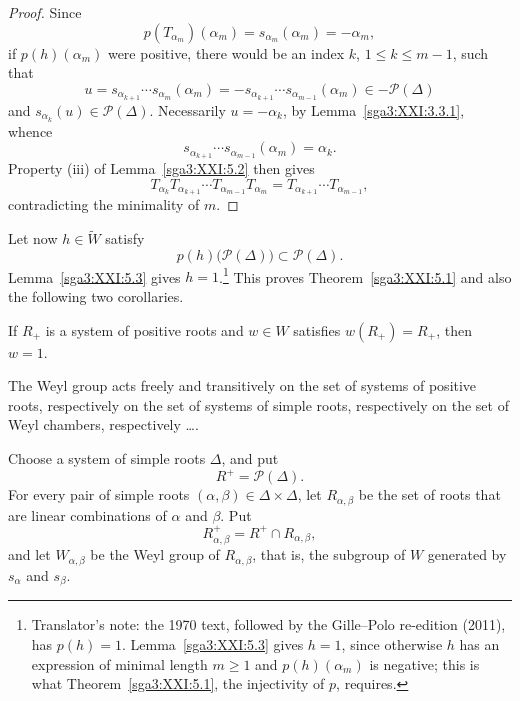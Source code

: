 \begin{proof}
Since
\[
 p(T_{\alpha_m})(\alpha_m)
 =s_{\alpha_m}(\alpha_m)=-\alpha_m,
\]
if \(p(h)(\alpha_m)\) were positive, there would be an index
\(k\), \(1\le k\le m-1\), such that
\[
 u=s_{\alpha_{k+1}}\cdots s_{\alpha_m}(\alpha_m)
 =-s_{\alpha_{k+1}}\cdots s_{\alpha_{m-1}}(\alpha_m)
 \in-\mathscr{P}(\Delta)
\]
and \(s_{\alpha_k}(u)\in\mathscr{P}(\Delta)\). Necessarily
\(u=-\alpha_k\), by Lemma~\ref{sga3:XXI:3.3.1}, whence
\[
 s_{\alpha_{k+1}}\cdots s_{\alpha_{m-1}}(\alpha_m)=\alpha_k.
\]
Property (iii) of Lemma~\ref{sga3:XXI:5.2} then gives
\[
 T_{\alpha_k}T_{\alpha_{k+1}}\cdots
 T_{\alpha_{m-1}}T_{\alpha_m}
 =
 T_{\alpha_{k+1}}\cdots T_{\alpha_{m-1}},
\]
contradicting the minimality of \(m\).
\end{proof}

Let now \(h\in\widetilde W\) satisfy
\[
 p(h)\bigl(\mathscr{P}(\Delta)\bigr)
 \subset\mathscr{P}(\Delta).
\]
Lemma~\ref{sga3:XXI:5.3} gives \(h=1\).\footnote{Translator's note: the 1970 text,
followed by the Gille--Polo re-edition (2011), has \(p(h)=1\). Lemma~\ref{sga3:XXI:5.3}
gives \(h=1\), since otherwise \(h\) has an expression of minimal length \(m\geq1\) and
\(p(h)(\alpha_m)\) is negative; this is what Theorem~\ref{sga3:XXI:5.1}, the injectivity
of \(p\), requires.} This proves
Theorem~\ref{sga3:XXI:5.1} and also the following two corollaries.

\begin{corollary}\label{sga3:XXI:5.4}
If \(R_+\) is a system of positive roots and \(w\in W\) satisfies
\(w(R_+)=R_+\), then \(w=1\).
\end{corollary}

\begin{corollary}\label{sga3:XXI:5.5}
The Weyl group acts freely and transitively on the set of systems of
positive roots, respectively on the set of systems of simple roots,
respectively on the set of Weyl chambers, respectively \ldots.
\end{corollary}

Choose a system of simple roots \(\Delta\), and put
\[
 R^+=\mathscr{P}(\Delta).
\]
For every pair of simple roots
\((\alpha,\beta)\in\Delta\times\Delta\), let
\(R_{\alpha,\beta}\) be the set of roots that are linear combinations
of \(\alpha\) and \(\beta\). Put
\[
 R^+_{\alpha,\beta}=R^+\cap R_{\alpha,\beta},
\]
and let \(W_{\alpha,\beta}\) be the Weyl group of
\(R_{\alpha,\beta}\), that is, the subgroup of \(W\) generated by
\(s_\alpha\) and \(s_\beta\).

